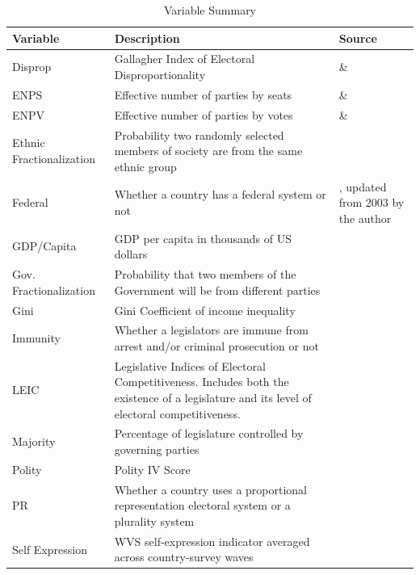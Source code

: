 \documentclass[a4paper]{article}\usepackage[]{graphicx}\usepackage[]{color}
\begin{document}
\begin{table}[!h]
    \begin{center}
    \caption{Variable Summary}
    \label{var_summary}
    \begin{tabular}{l m{7cm} m{3.5cm}}

            \hline
            Variable & Description & Source \\
            \hline \hline
            Disprop & Gallagher Index of Electoral Disproportionality & \cite{Gallagher2012} \& \cite{Carey2011} \\
            ENPS & Effective number of parties by seats & \cite{Gallagher2012} \& \cite{Carey2011} \\
            ENPV & Effective number of parties by votes & \cite{Gallagher2012} \& \cite{Carey2011} \\
            Ethnic Fractionalization & Probability two randomly selected members of society are from the same ethnic group & \cite{Alesina2003} \\
            Federal & Whether a country has a federal system or not & \cite{Carey2011}, updated from 2003 by the author \\           
            GDP/Capita & GDP per capita in thousands of US dollars & \cite{WorldBank2011} \\
            Gov. Fractionalization & Probability that two members of the Government will be from different parties & \cite{DPI2001} \\
            Gini & Gini Coefficient of income inequality & \cite{UNU2008} \\
            Immunity & Whether a legislators are immune from arrest and/or criminal prosecution or not & \cite{Fish2009} \\
            LEIC & Legislative Indices of Electoral Competitiveness. Includes both the existence of a legislature and its level of electoral competitiveness. & \cite{DPI2001} \\
            Majority & Percentage of legislature controlled by governing parties & \cite{DPI2001} \\
            Polity & Polity IV Score & \cite{Marshall2009} \\
            PR & Whether a country uses a proportional representation electoral system or a plurality system & \cite{DPI2001} \\
            Self Expression & WVS self-expression indicator averaged across country-survey waves & \cite{WVS2009} \\

\end{tabular}
\end{center}
\end{table}
\end{document}

